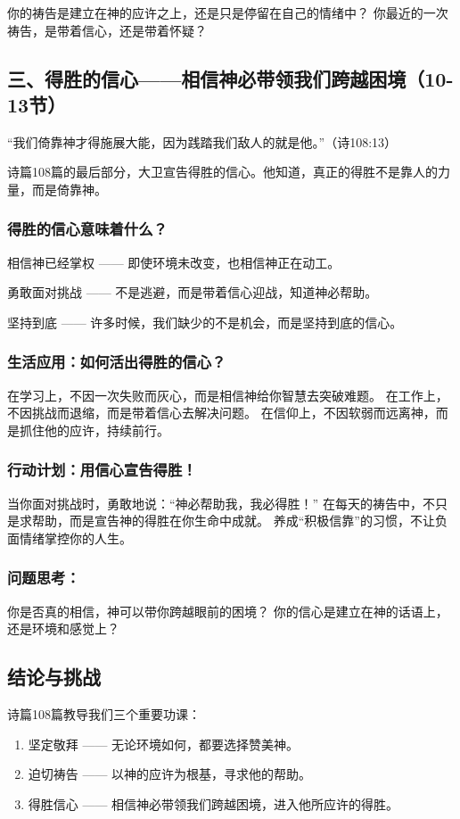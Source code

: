 \documentclass[a4paper, 12pt]{article}
\begin{document}
你的祷告是建立在神的应许之上，还是只是停留在自己的情绪中？
你最近的一次祷告，是带着信心，还是带着怀疑？
\subsection*{三、得胜的信心——相信神必带领我们跨越困境（10-13节）}
“我们倚靠神才得施展大能，因为践踏我们敌人的就是他。”（诗108:13）

诗篇108篇的最后部分，大卫宣告得胜的信心。他知道，真正的得胜不是靠人的力量，而是倚靠神。

\subsubsection*{得胜的信心意味着什么？}

\hspace{0.6cm}相信神已经掌权 —— 即使环境未改变，也相信神正在动工。

勇敢面对挑战 —— 不是逃避，而是带着信心迎战，知道神必帮助。

坚持到底 —— 许多时候，我们缺少的不是机会，而是坚持到底的信心。
\subsubsection*{生活应用：如何活出得胜的信心？}

在学习上，不因一次失败而灰心，而是相信神给你智慧去突破难题。
在工作上，不因挑战而退缩，而是带着信心去解决问题。
在信仰上，不因软弱而远离神，而是抓住他的应许，持续前行。
\subsubsection*{行动计划：用信心宣告得胜！}

当你面对挑战时，勇敢地说：“神必帮助我，我必得胜！”
在每天的祷告中，不只是求帮助，而是宣告神的得胜在你生命中成就。
养成“积极信靠”的习惯，不让负面情绪掌控你的人生。
\subsubsection*{问题思考：}

你是否真的相信，神可以带你跨越眼前的困境？
你的信心是建立在神的话语上，还是环境和感觉上？
\subsection*{结论与挑战}
诗篇108篇教导我们三个重要功课：
\begin{enumerate}
    \item 坚定敬拜 —— 无论环境如何，都要选择赞美神。

    \item 迫切祷告 —— 以神的应许为根基，寻求他的帮助。

    \item 得胜信心 —— 相信神必带领我们跨越困境，进入他所应许的得胜。

\end{enumerate}
\end{document}
